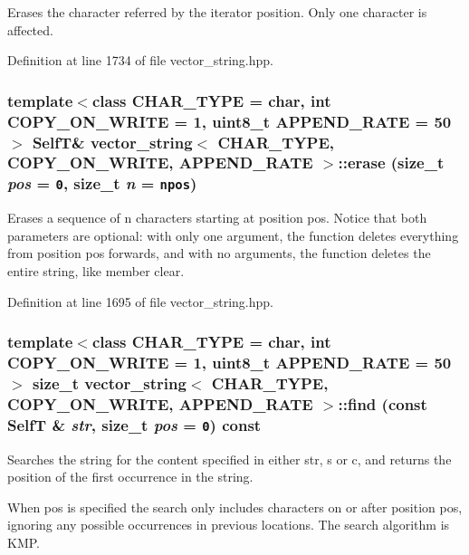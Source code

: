 Erases the character referred by the iterator position. Only one character is affected. 

Definition at line 1734 of file vector\_\-string.hpp.\hypertarget{classvector__string_11798027c9245194f48e666c45e0d6d9}{
\subsubsection[{erase}]{\setlength{\rightskip}{0pt plus 5cm}template$<$class CHAR\_\-TYPE  = char, int COPY\_\-ON\_\-WRITE = 1, uint8\_\-t APPEND\_\-RATE = 50$>$ {\bf SelfT}\& {\bf vector\_\-string}$<$ CHAR\_\-TYPE, COPY\_\-ON\_\-WRITE, APPEND\_\-RATE $>$::erase (size\_\-t {\em pos} = {\tt 0}, \/  size\_\-t {\em n} = {\tt {\bf npos}})}}
\label{classvector__string_11798027c9245194f48e666c45e0d6d9}


Erases a sequence of n characters starting at position pos. Notice that both parameters are optional: with only one argument, the function deletes everything from position pos forwards, and with no arguments, the function deletes the entire string, like member clear. 

Definition at line 1695 of file vector\_\-string.hpp.\hypertarget{classvector__string_5e64e995b1eea8c254bb5ade28fcbf0b}{
\subsubsection[{find}]{\setlength{\rightskip}{0pt plus 5cm}template$<$class CHAR\_\-TYPE  = char, int COPY\_\-ON\_\-WRITE = 1, uint8\_\-t APPEND\_\-RATE = 50$>$ size\_\-t {\bf vector\_\-string}$<$ CHAR\_\-TYPE, COPY\_\-ON\_\-WRITE, APPEND\_\-RATE $>$::find (const {\bf SelfT} \& {\em str}, \/  size\_\-t {\em pos} = {\tt 0}) const}}
\label{classvector__string_5e64e995b1eea8c254bb5ade28fcbf0b}


Searches the string for the content specified in either str, s or c, and returns the position of the first occurrence in the string.

When pos is specified the search only includes characters on or after position pos, ignoring any possible occurrences in previous locations. The search algorithm is KMP.

